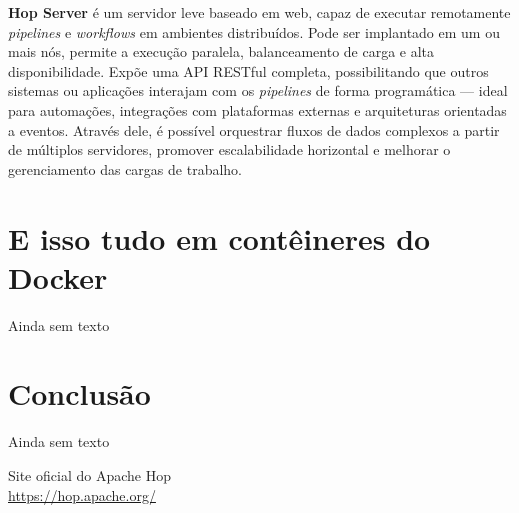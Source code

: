 \documentclass[a4paper,11pt]{article}
\begin{document}
\textbf{Hop Server} é um servidor leve baseado em web, capaz de executar remotamente \textit{pipelines} e \textit{workflows} em ambientes distribuídos. Pode ser implantado em um ou mais nós, permite a execução paralela, balanceamento de carga e alta disponibilidade. Expõe uma API RESTful completa, possibilitando que outros sistemas ou aplicações interajam com os \textit{pipelines} de forma programática — ideal para automações, integrações com plataformas externas e arquiteturas orientadas a eventos. Através dele, é possível orquestrar fluxos de dados complexos a partir de múltiplos servidores, promover escalabilidade horizontal e melhorar o gerenciamento das cargas de trabalho.

\section{E isso tudo em contêineres do Docker}
Ainda sem texto

\section{Conclusão}
Ainda sem texto



\begin{thebibliography}{7}
  Site oficial do Apache Hop \\
  \url{https://hop.apache.org/}
  
  
\end{thebibliography}
\end{document}
